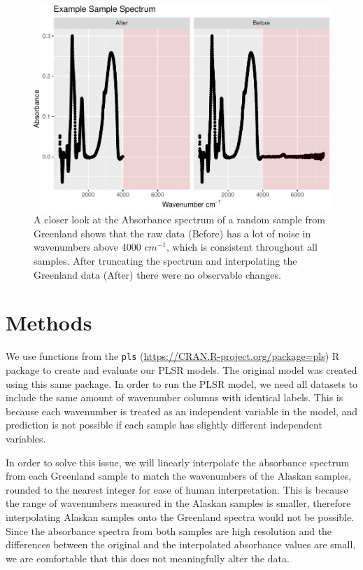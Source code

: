 \documentclass[water,article,submit,moreauthors,pdftex]{mdpi}
\begin{document}
\begin{figure}

{\centering \includegraphics{final_paper_draft_files/figure-latex/fig3-1} 

}

\caption{A closer look at the Absorbance spectrum of a random sample from Greenland shows that the raw data (Before) has a lot of noise in wavenumbers above 4000 $cm^{-1}$, which is consistent throughout all samples. After truncating the spectrum and interpolating the Greenland data (After) there were no observable changes.}\label{fig:fig3}
\end{figure}

\hypertarget{methods}{%
\section{Methods}\label{methods}}

We use functions from the \texttt{pls}
(\url{https://CRAN.R-project.org/package=pls}) R package to create and
evaluate our PLSR models. The original model was created using this same
package. In order to run the PLSR model, we need all datasets to include
the same amount of wavenumber columns with identical labels. This is
because each wavenumber is treated as an independent variable in the
model, and prediction is not possible if each sample has slightly
different independent variables.

In order to solve this issue, we will linearly interpolate the
absorbance spectrum from each Greenland sample to match the wavenumbers
of the Alaskan samples, rounded to the nearest integer for ease of human
interpretation. This is because the range of wavenumbers measured in the
Alaskan samples is smaller, therefore interpolating Alaskan samples onto
the Greenland spectra would not be possible. Since the absorbance
spectra from both samples are high resolution and the differences
between the original and the interpolated absorbance values are small,
we are comfortable that this does not meaningfully alter the data.
\end{document}

